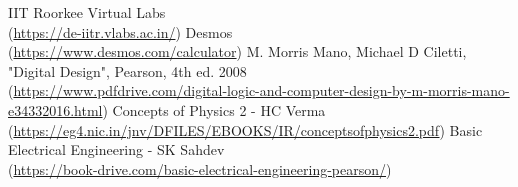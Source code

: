 \begin{thebibliography}{widestlabel}
	 IIT Roorkee Virtual Labs \\
	(\url{https://de-iitr.vlabs.ac.in/})
	 Desmos \\
	(\url{https://www.desmos.com/calculator})
	 M. Morris Mano, Michael D Ciletti, "Digital Design", Pearson, 4th ed. 2008 \\
	(\url{https://www.pdfdrive.com/digital-logic-and-computer-design-by-m-morris-mano-e34332016.html})
	 Concepts of Physics 2 - HC Verma\\
	(\url{https://eg4.nic.in/jnv/DFILES/EBOOKS/IR/conceptsofphysics2.pdf})
	 Basic Electrical Engineering - SK Sahdev\\
	(\url{https://book-drive.com/basic-electrical-engineering-pearson/})
\end{thebibliography}